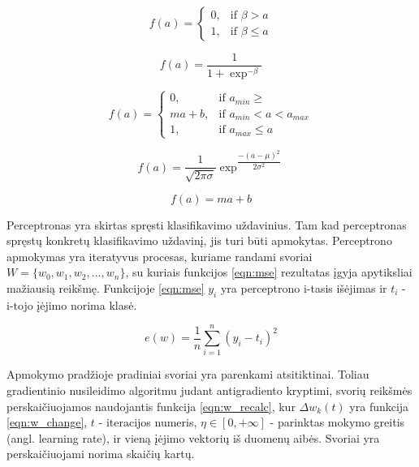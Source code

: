 \begin{equation}
	\label{eqn:unitStep}
	f(a) =
	\begin{cases}
		0, & \mbox{if } \beta > a \\
		1, & \mbox{if } \beta \leq a
	\end{cases}
\end{equation}

\begin{equation}
	\label{eqn:sigmoid}
	f(a) = \dfrac{1}{1 + \exp^{-\beta }}
\end{equation}

\begin{equation}
	\label{eqn:pieceLinear}
	f(a) =
	\begin{cases}
		0, & \mbox{if } a_{min} \geq  \\
		ma + b, & \mbox{if } a_{min} < a < a_{max} \\
		1, & \mbox{if } a_{max} \leq a
	\end{cases}
\end{equation}

\begin{equation}
	\label{eqn:gaussian}
	f(a) = \dfrac{1}{\sqrt{2\pi\sigma}} \exp^{\dfrac{-(a - \mu)^2}{2\sigma^2}}
\end{equation}

\begin{equation}
	\label{eqn:linear}
	f(a) = ma + b
\end{equation}

Perceptronas yra skirtas spręsti klasifikavimo uždavinius. Tam kad perceptronas spręstų konkretų klasifikavimo uždavinį, jis turi būti apmokytas. Perceptrono apmokymas yra iteratyvus procesas, kuriame randami svoriai $W = \{w_{0}, w_{1}, w_{2}, ..., w_{n}\}$, su kuriais funkcijos \ref{eqn:mse} rezultatas įgyja apytiksliai mažiausią reikšmę. Funkcijoje \ref{eqn:mse} $y_i$ yra perceptrono i-tasis išėjimas ir $t_i$ - i-tojo įėjimo norima klasė.

\begin{equation}
	\label{eqn:mse}
	e(w) = \dfrac{1}{n}\sum_{i=1}^{n}(y_i - t_i)^2
\end{equation}

Apmokymo pradžioje pradiniai svoriai yra parenkami atsitiktinai. Toliau gradientinio nusileidimo algoritmu judant antigradiento kryptimi, svorių reikšmės perskaičiuojamos naudojantis funkcija \ref{eqn:w_recalc}, kur $\Delta w_k(t)$ yra funkcija \ref{eqn:w_change}, $t$ - iteracijos numeris, $\eta \in [0, +\infty]$ - parinktas mokymo greitis (angl. learning rate), ir vieną įėjimo vektorių iš duomenų aibės. Svoriai yra perskaičiuojami norima skaičių kartų.

